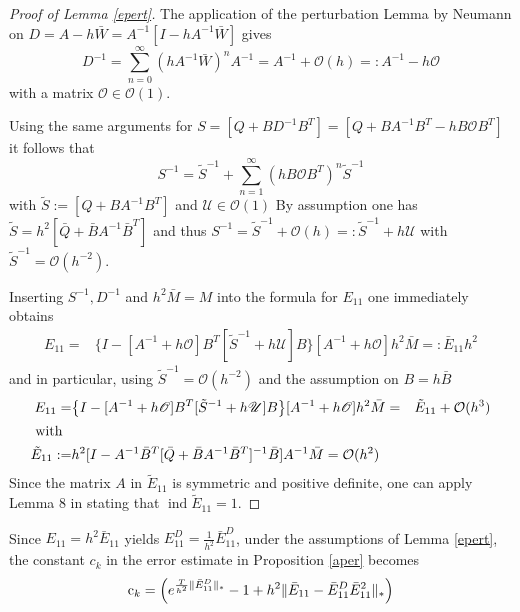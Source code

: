 \documentclass[a4paper,10pt,BCOR=15mm]{scrbook}
\DeclareMathOperator{\ind}{ind}
\providecommand{\norm}[1]{\lVert#1 \rVert}
\begin{document}
\begin{proof}[Proof of Lemma \ref{epert}]

 The application of the perturbation Lemma by Neumann on $D = A - h \bar W = A^{-1}[I-hA^{-1}\bar W]$ gives
\begin{equation*}
 D^{-1} = \sum _{n=0} ^ \infty (h A^{-1} \bar W)^nA^{-1} = A^{-1} + \mathcal O(h) =: A^{-1} - h \mathscr O
\end{equation*}
with a matrix $\mathscr O \in \mathcal O(1)$.

Using the same arguments for $S=[Q + BD^{-1}B^T] = [Q + BA^{-1}B^T - h B\mathscr O B^T]$ it follows that
\begin{equation*}
 S^{-1} = \tilde S^{-1} +  \sum _{n=1} ^ \infty (h B\mathscr O B^T )^n \tilde S^{-1}
\end{equation*}
with $\tilde S := [Q+BA^{-1}B^T]$ and $\mathscr U \in \mathcal O(1) $ By assumption one has $\tilde S =h^2 [\bar Q+\bar BA^{-1}\bar B^T]$ and thus
$ S^{-1} = \tilde S^{-1} +  \mathcal O(h) =: \tilde S^{-1} +  h \mathscr U $ with $\tilde S^{-1} = \mathcal O(h^{-2})$.

Inserting $S^{-1},D^{-1}$ and $h^2 \bar M = M$ into the formula for $E_{11}$ one immediately obtains
\begin{align*}
 E_{11} = &\bigl \{ I- [A^{-1}+h \mathscr O ]B^T[\tilde S ^{-1} + h\mathscr U]B\bigr \} [A^{-1}+h\mathscr O ] h^2 \bar M =: \bar E_{11} h^2
\end{align*}
and in particular, using $\tilde S^{-1} = \mathcal O(h^{-2})$ and the assumption on $B=h\bar B$ 
\begin{align*}
  E_{11} = &\bigl \{ I- [A^{-1}+h \mathscr O ]B^T[\tilde S ^{-1} + h\mathscr U]B\bigr \} [A^{-1}+h\mathscr O ] h^2 \bar M
= &\tilde E_{11} + \mathcal O(h^3) \\
\intertext{ with}
\tilde E_{11} := &h^2[I-A^{-1}\bar B^T[\bar Q+\bar B A^{-1}\bar B^T]^{-1} \bar B ] A^{-1} \bar M = \mathcal O(h^2)
\end{align*}
Since the matrix $A$ in $\tilde E_{11}$ is symmetric and positive definite, one can apply Lemma 8 in \cite{emme} stating that $\ind \tilde E_{11} =1$.
\end{proof}

Since $E_{11} = h^2\bar E_{11}$ yields $E_{11}^D = \frac{1}{h^2}\bar E_{11}^D$, under the assumptions of Lemma \ref{epert}, the constant $c_k$ in the error estimate in Proposition \ref{aper} becomes
\begin{equation*}
\text c _k = \left ( e^{\frac{T}{h^2} \norm{\bar E_{11}^D}_*} - 1 + h^2 \norm{\bar E_{11} -\bar E_{11}^D\bar E_{11}^2}_* \right ) 
\end{equation*}
\end{document}
